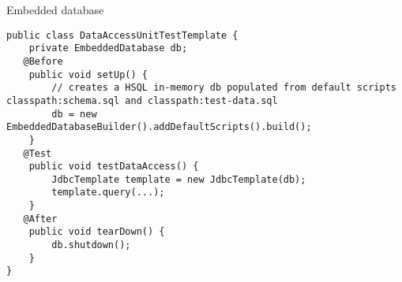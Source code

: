 \documentclass[hyperref={pdfauthor=\AUTHOR},14pt]{beamer}
\begin{document}
\begin{frame}[t, fragile]{Embedded database}
\begin{lstlisting}[style=Java]
public class DataAccessUnitTestTemplate {
    private EmbeddedDatabase db;
   @Before
    public void setUp() {
        // creates a HSQL in-memory db populated from default scripts classpath:schema.sql and classpath:test-data.sql
        db = new EmbeddedDatabaseBuilder().addDefaultScripts().build();		
    }
   @Test
    public void testDataAccess() {
        JdbcTemplate template = new JdbcTemplate(db);
        template.query(...);
    }
   @After
    public void tearDown() {
        db.shutdown();
    }
}
\end{lstlisting}
\end{frame}

\end{document}
